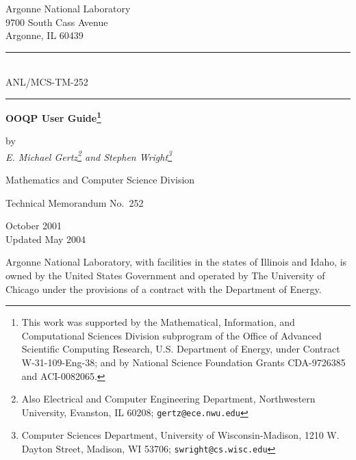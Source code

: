 \documentclass[twoside]{article}
\author{ E. Michael GERTZ and Stephen J. WRIGHT}
\begin{document}
\setcounter{page}{1}
\thispagestyle{empty}
\begin{center}
\vspace*{-1in}
Argonne National Laboratory \\
9700 South Cass Avenue\\
Argonne, IL 60439

\vspace{.2in}
\rule{1.5in}{.01in}\\ [1ex]
ANL/MCS-TM-252 \\
\rule{1.5in}{.01in}


\vspace{1in}
{\large\bf OOQP User Guide\footnote{This 
work was supported by the Mathematical,
Information, and Computational Sciences Division subprogram of the
Office of Advanced Scientific Computing Research, U.S. Department of
Energy, under Contract W-31-109-Eng-38; and by National Science
Foundation Grants CDA-9726385 and ACI-0082065.}
}

\vspace{.2in}
by \\ [3ex]

{\large\it E. Michael Gertz\footnote{Also
Electrical and Computer Engineering Department, Northwestern University, Evanston, IL 60208; {\tt gertz@ece.nwu.edu}}
and Stephen Wright\footnote{Computer Sciences Department,
University of Wisconsin-Madison, 1210 W. Dayton Street,
Madison, WI 53706; {\tt swright@cs.wisc.edu}}}\\

\vspace{.2in}


\vspace{1in}
Mathematics and Computer Science Division

\bigskip

Technical Memorandum No.\ 252

\vspace{.5in}
October 2001 \\
Updated  May 2004
\end{center}

\vfill
\noindent


\newpage
\noindent
Argonne National Laboratory, with facilities in the states of Illinois
and Idaho, is owned by the United States Government and operated by The
University of Chicago under the provisions of a contract with the
Department of Energy.

\vspace{2in}
\end{document}
